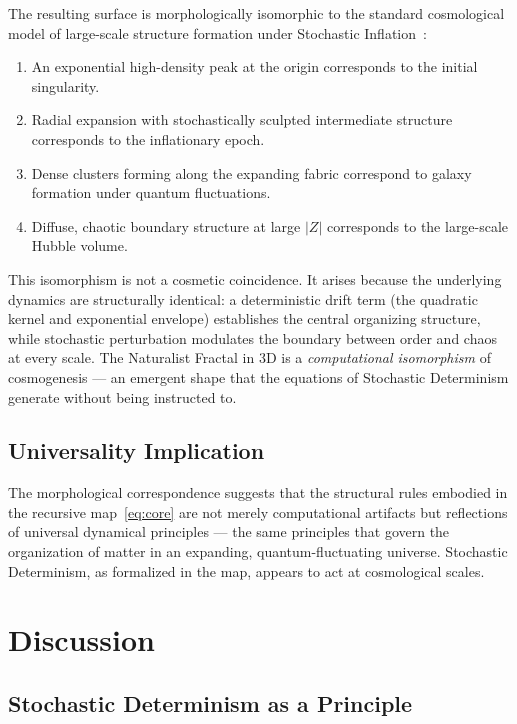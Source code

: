 \documentclass[twocolumn,amsmath,amssymb,prl]{revtex4-2}
\begin{document}
The resulting surface is morphologically isomorphic to the standard
cosmological model of large-scale structure formation under Stochastic
Inflation~\cite{Starobinsky1986,Linde1994}:

\begin{enumerate}
  \item An exponential high-density peak at the origin corresponds to the
        initial singularity.
  \item Radial expansion with stochastically sculpted intermediate structure
        corresponds to the inflationary epoch.
  \item Dense clusters forming along the expanding fabric correspond to
        galaxy formation under quantum fluctuations.
  \item Diffuse, chaotic boundary structure at large $|Z|$ corresponds to
        the large-scale Hubble volume.
\end{enumerate}

This isomorphism is not a cosmetic coincidence.  It arises because the
underlying dynamics are structurally identical: a deterministic drift term
(the quadratic kernel and exponential envelope) establishes the central
organizing structure, while stochastic perturbation modulates the boundary
between order and chaos at every scale.  The Naturalist Fractal in 3D is a
\emph{computational isomorphism} of cosmogenesis — an emergent shape that the
equations of Stochastic Determinism generate without being instructed to.

\subsection{Universality Implication}

The morphological correspondence suggests that the structural rules embodied
in the recursive map~\eqref{eq:core} are not merely computational artifacts
but reflections of universal dynamical principles — the same principles that
govern the organization of matter in an expanding, quantum-fluctuating
universe.  Stochastic Determinism, as formalized in the map, appears to act
at cosmological scales.

\section{Discussion}
\label{sec:discussion}

\subsection{Stochastic Determinism as a Principle}
\end{document}
